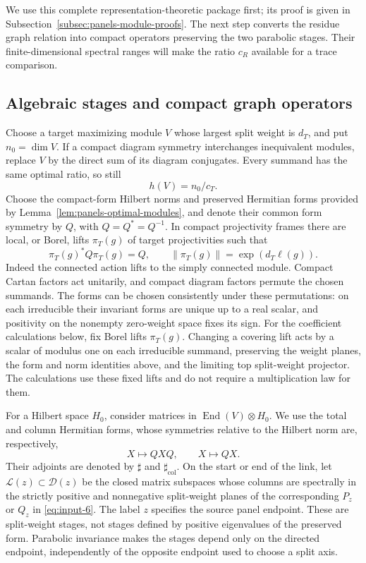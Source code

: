 We use this complete representation-theoretic package first; its proof is
given in Subsection~\ref{subsec:panels-module-proofs}.  The next step converts the
residue graph relation into compact operators preserving the two parabolic
stages.  Their finite-dimensional spectral ranges will make the ratio
$c_R$ available for a trace comparison.

\subsection{Algebraic stages and compact graph operators}

Choose a target maximizing module $V$ whose largest split weight is
$d_T$, and put $n_0=\dim V$.  If a compact diagram symmetry interchanges
inequivalent modules, replace $V$ by the direct sum of its diagram
conjugates.  Every summand has the same optimal ratio, so still
\begin{equation}\label{eq:panels-target-ratio}
 h(V)=n_0/c_T.
\end{equation}
Choose the compact-form Hilbert norms and preserved Hermitian forms
provided by Lemma~\ref{lem:panels-optimal-modules}, and denote their common
form symmetry by $Q$, with $Q=Q^*=Q^{-1}$.  In compact projectivity frames
there are local, or Borel, lifts $\pi_T(g)$ of target projectivities such
that
\begin{equation}\label{eq:panels-lifts}
 \pi_T(g)^*Q\pi_T(g)=Q,
 \qquad \|\pi_T(g)\|=\exp(d_T\ell(g)).
\end{equation}
Indeed the connected action lifts to the simply connected module.
Compact Cartan factors act unitarily, and compact diagram factors
permute the chosen summands.  The forms can be chosen consistently under
these permutations: on each irreducible their invariant forms are
unique up to a real scalar, and positivity on the nonempty zero-weight
space fixes its sign.  For the coefficient calculations below, fix Borel
lifts $\pi_T(g)$.  Changing a covering lift acts by a scalar of modulus one
on each irreducible summand, preserving the weight planes, the form and norm
identities above, and the limiting top split-weight projector.  The
calculations use these fixed lifts and do not require a multiplication law
for them.

For a Hilbert space $H_0$, consider matrices in
$\operatorname{End}(V)\otimes H_0$.  We use the total and column
Hermitian forms, whose symmetries relative to the Hilbert norm are,
respectively,
\[
 X\longmapsto QXQ,\qquad X\longmapsto QX.
\]
Their adjoints are denoted by $\sharp$ and
$\sharp_{\mathrm{col}}$.  On the start or end of the link, let
$\mathcal L(z)\subset\mathcal D(z)$ be the closed matrix subspaces
whose columns are spectrally in the strictly positive and nonnegative
split-weight planes of the corresponding $P_z$ or $Q_z$ in
\eqref{eq:input-6}.  The label $z$ specifies the source panel endpoint.
These are split-weight stages, not stages defined by positive eigenvalues
of the preserved form.  Parabolic invariance makes the stages depend only
on the directed endpoint, independently of the opposite endpoint used to
choose a split axis.

